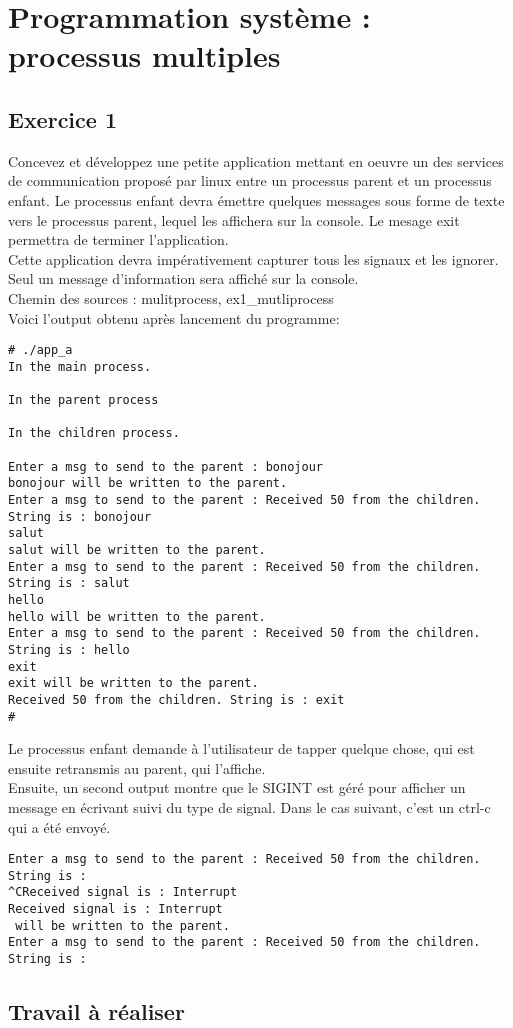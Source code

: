 \section{Programmation système : processus multiples}
\subsection{Exercice 1}
Concevez et développez une petite application mettant en oeuvre un des services de communication proposé par linux entre un processus parent et un processus enfant.
Le processus enfant devra émettre quelques messages sous forme de texte vers le processus parent, lequel les affichera sur la console. Le mesage exit permettra de terminer l'application.\\
Cette application devra impérativement capturer tous les signaux et les ignorer. Seul un message d'information sera affiché sur la console.\\
Chemin des sources : mulitprocess, ex1_mutliprocess\\
Voici l'output obtenu après lancement du programme:
\begin{lstlisting}
# ./app_a 
In the main process.

In the parent process

In the children process.

Enter a msg to send to the parent : bonojour
bonojour will be written to the parent.
Enter a msg to send to the parent : Received 50 from the children. String is : bonojour
salut
salut will be written to the parent.
Enter a msg to send to the parent : Received 50 from the children. String is : salut
hello
hello will be written to the parent.
Enter a msg to send to the parent : Received 50 from the children. String is : hello
exit
exit will be written to the parent.
Received 50 from the children. String is : exit
#
\end{lstlisting}
Le processus enfant demande à l'utilisateur de tapper quelque chose, qui est ensuite retransmis au parent, qui l'affiche. \\
Ensuite, un second output montre que le SIGINT est géré pour afficher un message en écrivant  suivi du type de signal. Dans le cas suivant, c'est un ctrl-c qui a été envoyé. 
\begin{lstlisting}
Enter a msg to send to the parent : Received 50 from the children. String is : 
^CReceived signal is : Interrupt
Received signal is : Interrupt
 will be written to the parent.
Enter a msg to send to the parent : Received 50 from the children. String is : 
\end{lstlisting}

\subsection{Travail à réaliser}


